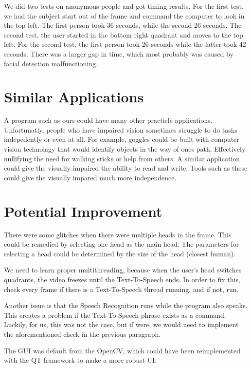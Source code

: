 \documentclass{article}
\begin{document}
We did two tests on anonymous people and got timing results.
For the first test, we had the subject start out of the frame and command the computer to look in the top left.
The first person took 36 seconds, while the second 26 seconds.
The second test, the user started in the bottom right quadrant and moves to the top left.
For the second test, the first person took 26 seconds while the latter took 42 seconds.
There was a larger gap in time, which most probably was caused by facial detection malfunctioning.


\section{Similar Applications}
A program such as ours could have many other practicle applications. 
Unfortunatly, people who have impaired vision sometimes struggle to do tasks indepedently or even at all. 
For example, goggles could be built with computer vision technolagy that would identify objects in the way of ones path.
Effectively nullifying the need for walking sticks or help from others. 
A similar application could give the visually impaired the ability to read and write.
Tools such as these could give the visually impared much more independence. 
\section{Potential Improvement}


There were some glitches when there were multiple heads in the frame.
This could be remedied by selecting one head as the main head.
The parameters for selecting a head could be determined by the size of the head (closest human).


We need to learn proper multithreading, because when the user's head switches quadrants, the video freezes until the Text-To-Speech ends.
In order to fix this, check every frame if there is a Text-To-Speech thread running, and if not, run.


Another issue is that the Speech Recognition runs while the program also speaks.
This creates a problem if the Text-To-Speech phrase exists as a command.
Luckily, for us, this was not the case, but if were, we would need to implement the aforementioned check in the previous paragraph.


The GUI was default from the OpenCV, which could have been reimplemented with the QT framework to make a more robust UI.



\end{document}
